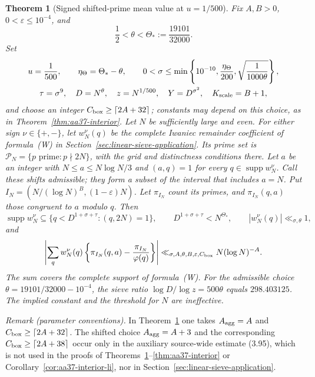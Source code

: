 \documentclass{amsart}
\newtheorem{theorem}{Theorem}[section]
\numberwithin{equation}{section}
\theoremstyle{definition}
\theoremstyle{plain}
\begin{document}
\begin{theorem}[Signed shifted-prime mean value at $u=1/500$]
\label{thm:aa37-fixed-u}
Fix $A,B>0$, $0<\varepsilon\le10^{-4}$, and
\[
 \frac12<\theta<\Theta_*:=\frac{19101}{32000}.
\]
Set
\[
\begin{gathered}
 u=\frac1{500},\qquad \eta_\Theta=\Theta_*-\theta,\qquad
 0<\sigma\le\min\left\{10^{-10},\frac{\eta_\Theta}{200},
                         \sqrt{\frac1{1000\theta}}\right\},\\
 \tau=\sigma^9,\quad D=N^\theta,\quad z=N^{1/500},
 \quad Y=D^{\sigma^2},\quad K_{\rm scale}=B+1,
\end{gathered}
\]
and choose an integer
$C_{\rm box}\ge\lceil2A+32\rceil$; constants may depend on this choice,
as in Theorem~\ref{thm:aa37-interior}.
Let $N$ be sufficiently large and even. For either sign
$\nu\in\{+,-\}$, let $w_N^\nu(q)$ be the complete Iwaniec remainder
coefficient of formula~\textup{(W)} in
Section~\ref{sec:linear-sieve-application}. Its prime set is
$\mathcal P_N=\{p\text{ prime}:p\nmid2N\}$, with the grid and
distinctness conditions there. Let $a$ be an integer with
$N\le a\le N\log N/3$ and $(a,q)=1$ for every
$q\in\operatorname{supp}w_N^\nu$.
Call these shifts admissible; they form a subset of the interval that includes
$a=N$.
Put $I_N=(N/(\log N)^B,(1-\varepsilon)N)$. Let $\pi_{I_N}$ count
its primes, and $\pi_{I_N}(q,a)$ those congruent to $a$ modulo $q$.
Then
\[
 \operatorname{supp}w_N^\nu\subseteq
 \{q<D^{1+\sigma+\tau}:(q,2N)=1\},\qquad
 D^{1+\sigma+\tau}<N^{\Theta_*},
 \qquad |w_N^\nu(q)|\ll_{\sigma,\theta}1,
\]
and
\[
 \left|\sum_q w_N^\nu(q)
  \left\{\pi_{I_N}(q,a)-\frac{\pi_{I_N}}{\varphi(q)}\right\}\right|
 \ll_{\sigma,A,\theta,B,\varepsilon,C_{\rm box}}N(\log N)^{-A}.
\]
The sum covers the complete support of formula~\textup{(W)}.
For the admissible choice
$\theta=19101/32000-10^{-4}$, the sieve ratio
$\log D/\log z=500\theta$ equals $298.403125$.
The implied constant and the threshold for $N$ are ineffective.
\end{theorem}

\medskip
\noindent\textit{Remark (parameter conventions).}
In Theorem~\ref{thm:aa37-fixed-u} one takes $A_{\rm agg}=A$ and
$C_{\rm box}\ge\lceil2A+32\rceil$.  The shifted choice
$A_{\rm agg}=A+3$ and the corresponding
$C_{\rm box}\ge\lceil2A+38\rceil$ occur only in the auxiliary
source-wide estimate (3.95), which is not used in the proofs of
Theorems~\ref{thm:aa37-fixed-u}--\ref{thm:aa37-interior} or
Corollary~\ref{cor:aa37-interior-li}, nor in Section~\ref{sec:linear-sieve-application}.
\end{document}
